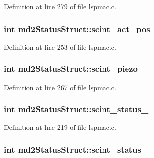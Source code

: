 Definition at line 279 of file lspmac.\-c.

\hypertarget{structmd2StatusStruct_a1c146fc792c4285eed5b2c446c214f98}{
\subsubsection[{scint\-\_\-act\-\_\-pos}]{\setlength{\rightskip}{0pt plus 5cm}int md2\-Status\-Struct\-::scint\-\_\-act\-\_\-pos}}\label{structmd2StatusStruct_a1c146fc792c4285eed5b2c446c214f98}


Definition at line 253 of file lspmac.\-c.

\hypertarget{structmd2StatusStruct_a031be48adfa016c637d6eae49054c435}{
\subsubsection[{scint\-\_\-piezo}]{\setlength{\rightskip}{0pt plus 5cm}int md2\-Status\-Struct\-::scint\-\_\-piezo}}\label{structmd2StatusStruct_a031be48adfa016c637d6eae49054c435}


Definition at line 267 of file lspmac.\-c.

\hypertarget{structmd2StatusStruct_a1723870357f428ac5c2758a2c9a475c7}{
\subsubsection[{scint\-\_\-status\-\_\-1}]{\setlength{\rightskip}{0pt plus 5cm}int md2\-Status\-Struct\-::scint\-\_\-status\-\_}}\label{structmd2StatusStruct_a1723870357f428ac5c2758a2c9a475c7}


Definition at line 219 of file lspmac.\-c.

\hypertarget{structmd2StatusStruct_a4e5bc72e2f4007370f1c29ea272c952f}{
\subsubsection[{scint\-\_\-status\-\_\-2}]{\setlength{\rightskip}{0pt plus 5cm}int md2\-Status\-Struct\-::scint\-\_\-status\-\_}}\label{structmd2StatusStruct_a4e5bc72e2f4007370f1c29ea272c952f}


